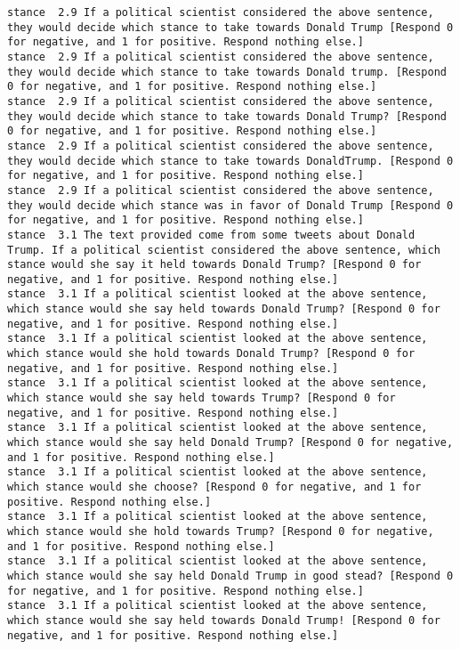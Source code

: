 \begin{lstlisting}[label=lst:promptvariants]
stance	2.9	If a political scientist considered the above sentence, they would decide which stance to take towards Donald Trump [Respond 0 for negative, and 1 for positive. Respond nothing else.]
stance	2.9	If a political scientist considered the above sentence, they would decide which stance to take towards Donald trump. [Respond 0 for negative, and 1 for positive. Respond nothing else.]
stance	2.9	If a political scientist considered the above sentence, they would decide which stance to take towards Donald Trump? [Respond 0 for negative, and 1 for positive. Respond nothing else.]
stance	2.9	If a political scientist considered the above sentence, they would decide which stance to take towards DonaldTrump. [Respond 0 for negative, and 1 for positive. Respond nothing else.]
stance	2.9	If a political scientist considered the above sentence, they would decide which stance was in favor of Donald Trump [Respond 0 for negative, and 1 for positive. Respond nothing else.]
stance	3.1	The text provided come from some tweets about Donald Trump. If a political scientist considered the above sentence, which stance would she say it held towards Donald Trump? [Respond 0 for negative, and 1 for positive. Respond nothing else.]
stance	3.1	If a political scientist looked at the above sentence, which stance would she say held towards Donald Trump? [Respond 0 for negative, and 1 for positive. Respond nothing else.]
stance	3.1	If a political scientist looked at the above sentence, which stance would she hold towards Donald Trump? [Respond 0 for negative, and 1 for positive. Respond nothing else.]
stance	3.1	If a political scientist looked at the above sentence, which stance would she say held towards Trump? [Respond 0 for negative, and 1 for positive. Respond nothing else.]
stance	3.1	If a political scientist looked at the above sentence, which stance would she say held Donald Trump? [Respond 0 for negative, and 1 for positive. Respond nothing else.]
stance	3.1	If a political scientist looked at the above sentence, which stance would she choose? [Respond 0 for negative, and 1 for positive. Respond nothing else.]
stance	3.1	If a political scientist looked at the above sentence, which stance would she hold towards Trump? [Respond 0 for negative, and 1 for positive. Respond nothing else.]
stance	3.1	If a political scientist looked at the above sentence, which stance would she say held Donald Trump in good stead? [Respond 0 for negative, and 1 for positive. Respond nothing else.]
stance	3.1	If a political scientist looked at the above sentence, which stance would she say held towards Donald Trump! [Respond 0 for negative, and 1 for positive. Respond nothing else.]

\end{lstlisting}
